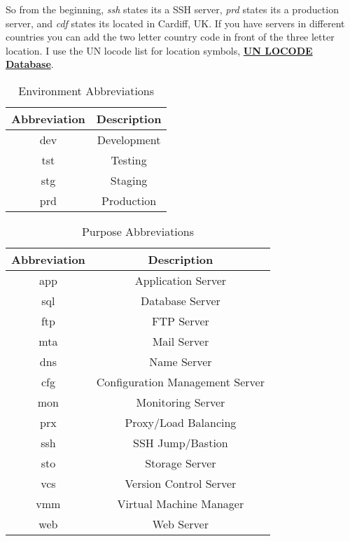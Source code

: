 So from the beginning, \textit{ssh} states its a SSH server, \textit{prd} states its a production server, and \textit{cdf} states its located in Cardiff, UK.  If you have servers in different countries you can add the two letter country code in front of the three letter location.  I use the UN locode list for location symbols, \href{http://www.unece.org/cefact/locode/service/location.html}{\textbf{UN LOCODE Database}}.

\begin{table}[htb]
\centering
\begin{tabular}{|c|c|}
\hline
\rowcolor{Gray}
Abbreviation & Description\\
\hline
dev & Development\\
tst & Testing\\
stg & Staging\\
prd & Production\\
\hline
\end{tabular}
\caption{Environment Abbreviations}
\label{tab:evironmentAbb}
\end{table}

\begin{table}[htb]
\centering
\begin{tabular}{|c|c|}
\hline
\rowcolor{Gray}
Abbreviation & Description\\
\hline
app & Application Server\\
sql & Database Server\\
ftp & FTP Server\\
mta & Mail Server\\
dns & Name Server\\
cfg & Configuration Management Server\\
mon & Monitoring Server\\
prx & Proxy/Load Balancing\\
ssh & SSH Jump/Bastion\\
sto & Storage Server\\
vcs & Version Control Server\\
vmm & Virtual Machine Manager\\
web & Web Server\\
\hline
\end{tabular}
\caption{Purpose Abbreviations}
\label{tab:purposeAbb}
\end{table}